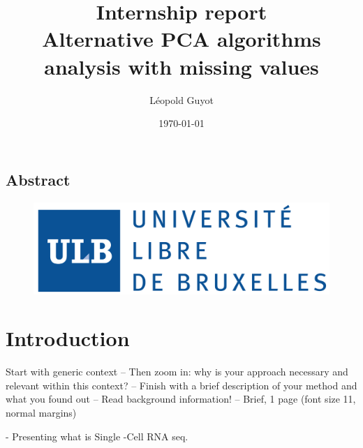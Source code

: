\documentclass[a4paper, 11pt, twocolumn]{article}
\title{\Large Internship report \\
\huge Alternative PCA algorithms analysis with missing values}
\author{Léopold Guyot}
\date{\today}
\begin{document}
\pagestyle{fancy}
\setlength{\headheight}{25.0117pt}
\fancyhead{}\fancyfoot{}
\fancyfoot[R]{\thepage}

\onecolumn
\maketitle

\begin{tcolorbox}[breakable,colback=white,colframe=black,width=\dimexpr\textwidth+12mm\relax,enlarge left by=-6mm]

\section*{Abstract}


\end{tcolorbox}

\begin{figure}[H]
          \begin{minipage}{\textwidth}
                \centering
                \includegraphics[width = .8\linewidth]{img/LOGO_Universite__libre_bruxelles.png}
          \end{minipage}
\end{figure}


\twocolumn
\section{Introduction}

Start with generic context
– Then zoom in: why is your approach necessary
and relevant within this context?
– Finish with a brief description of your method and
what you found out
– Read background information!
– Brief, 1 page (font size 11, normal margins)


- Presenting what is Single -Cell RNA seq.
\end{document}
